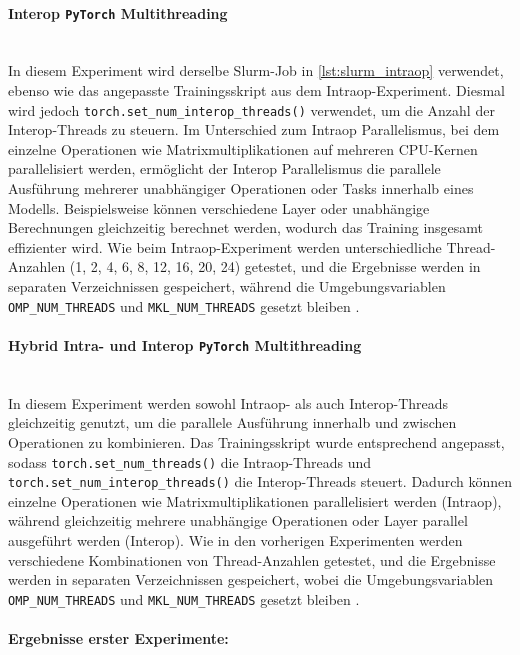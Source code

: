 \documentclass{article}
\begin{document}
\paragraph{Interop \texttt{PyTorch} Multithreading} \mbox{}\\
In diesem Experiment wird derselbe Slurm-Job in \ref{lst:slurm_intraop} verwendet, ebenso wie das angepasste Trainingsskript aus dem Intraop-Experiment. 
Diesmal wird jedoch \texttt{torch.set\_num\_interop\_threads()} verwendet, um die Anzahl der Interop-Threads zu steuern. 
Im Unterschied zum Intraop Parallelismus, bei dem einzelne Operationen wie Matrixmultiplikationen auf mehreren CPU-Kernen parallelisiert werden, 
ermöglicht der Interop Parallelismus die parallele Ausführung mehrerer unabhängiger Operationen oder Tasks innerhalb eines Modells. 
Beispielsweise können verschiedene Layer oder unabhängige Berechnungen gleichzeitig berechnet werden, wodurch das Training insgesamt effizienter wird. 
Wie beim Intraop-Experiment werden unterschiedliche Thread-Anzahlen (1, 2, 4, 6, 8, 12, 16, 20, 24)  getestet, und die Ergebnisse werden in separaten Verzeichnissen gespeichert, 
während die Umgebungsvariablen \texttt{OMP\_NUM\_THREADS} und \texttt{MKL\_NUM\_THREADS} gesetzt bleiben \parencite{pytorch2025threading}.
\vspace{0.5em}
\paragraph{Hybrid Intra- und Interop \texttt{PyTorch} Multithreading} \mbox{}\\
In diesem Experiment werden sowohl Intraop- als auch Interop-Threads gleichzeitig genutzt, um die parallele Ausführung innerhalb und zwischen Operationen zu kombinieren. 
Das Trainingsskript wurde entsprechend angepasst, sodass \texttt{torch.set\_num\_threads()} die Intraop-Threads und \texttt{torch.set\_num\_interop\_threads()} die Interop-Threads steuert. 
Dadurch können einzelne Operationen wie Matrixmultiplikationen parallelisiert werden (Intraop), während gleichzeitig mehrere unabhängige Operationen oder Layer parallel ausgeführt werden (Interop). 
Wie in den vorherigen Experimenten werden verschiedene Kombinationen von Thread-Anzahlen getestet, 
und die Ergebnisse werden in separaten Verzeichnissen gespeichert, wobei die Umgebungsvariablen \texttt{OMP\_NUM\_THREADS} und \texttt{MKL\_NUM\_THREADS} gesetzt bleiben 
\parencite{pytorch2025threading}.

\paragraph{Ergebnisse erster Experimente:} \mbox{}\\
\end{document}
